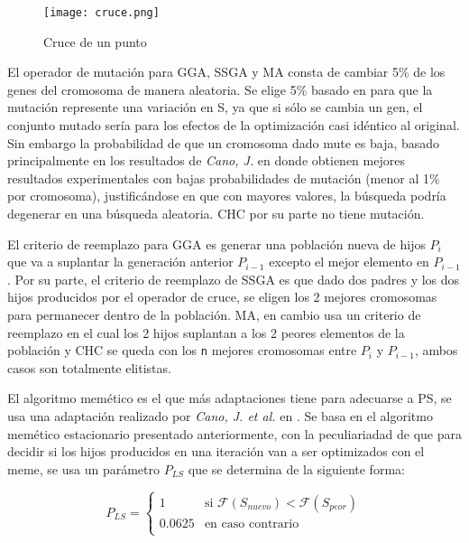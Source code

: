 \begin{figure}[]
\centering
\texttt{[image: cruce.png]}
\caption[Cruce de un punto]{Cruce de un punto}
\label{cruce}
\end{figure}

El operador de mutación para GGA, SSGA y MA consta de cambiar 5\% de los genes del cromosoma de manera aleatoria. Se elige 5\%  basado en \cite{flores2014metaheuristics} para que la mutación represente una variación en S, ya que si sólo se cambia un gen, el conjunto mutado sería para los efectos de la optimización casi idéntico al original. Sin embargo la probabilidad de que un cromosoma dado mute es baja, basado principalmente en los resultados de \emph{Cano, J.} en \cite{de2004reduccion} donde obtienen mejores resultados experimentales con bajas probabilidades de mutación (menor al 1\% por cromosoma), justificándose en que con mayores valores, la búsqueda podría degenerar en una búsqueda aleatoria. CHC por su parte no tiene mutación.

El criterio de reemplazo para GGA es generar una población nueva de hijos $P_i$ que va a suplantar la generación anterior $P_{i-1}$ excepto el mejor elemento en $P_{i-1}$. Por su parte, el criterio de reemplazo de SSGA es que dado dos padres y los dos hijos producidos por el operador de cruce, se eligen los 2 mejores cromosomas para permanecer dentro de la población. MA, en cambio usa un criterio de reemplazo en el cual los 2 hijos suplantan a los 2 peores elementos de la población y CHC se queda con los \texttt{n} mejores cromosomas entre $P_i$ y $P_{i-1}$, ambos casos son totalmente elitistas.

El algoritmo memético es el que más adaptaciones tiene para adecuarse a PS, se usa una adaptación realizado por \emph{Cano, J. et al.} en \cite{garcia2008memetic}. Se basa en el algoritmo memético estacionario presentado anteriormente, con la peculiariadad de que para decidir si los hijos producidos en una iteración van a ser optimizados con el meme, se usa un parámetro $P_{LS}$ que se determina de la siguiente forma:

\begin{equation}
P_{LS}=
\begin{cases}
1 & \text{si } \mathcal{F}(S_{nuevo}) < \mathcal{F}(S_{peor})\\
0.0625 & \text{en caso contrario}\\
\end{cases}
\end{equation}

